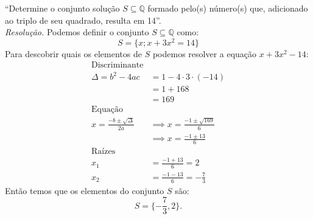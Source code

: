 \enquote{Determine o conjunto solução $S \subseteq \mathbb{Q}$ formado pelo(s) número(s) que, adicionado ao triplo de seu quadrado, resulta em 14}. 
\\
\emph{Resolução.} Podemos definir o conjunto $S \subseteq \mathbb{Q}$ como:
\begin{displaymath}
    S = \{x; x + 3x^2 = 14 \}
\end{displaymath}
Para descobrir quais os elementos de $S$ podemos resolver a equação $x + 3x^2 - 14$:
\begin{align*}
    \text{Discriminante} \\
    \Delta = b^2 - 4ac & =
    1 - 4 \cdot 3 \cdot (-14) \\ & =
    1 + 168 \\ & =
    169
    \\
    \text{Equação} \\
    x = \frac{-b \pm \sqrt{\Delta}}{2a} & \implies
    x = \frac{-1 \pm \sqrt{169}}{6} \\ & \implies
    x = \frac{-1 \pm 13}{6}
    \\
    \text{Raízes} \\
    x_1 &= \frac{-1 + 13}{6} = 2 \\ x_2 &= \frac{-1 - 13}{6} = -\frac{7}{3}
\end{align*}
Então temos que os elementos do conjunto $S$ são:
\begin{displaymath}
    S = \{ -\frac{7}{3}, 2 \}.
\end{displaymath}